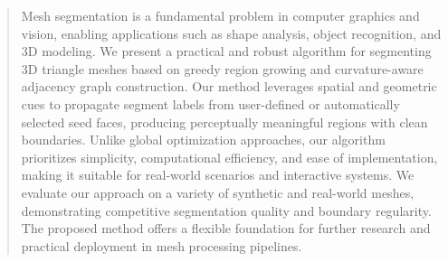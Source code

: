 \begin{abstract}
Mesh segmentation is a fundamental problem in computer graphics and vision, enabling applications such as shape analysis, object recognition, and 3D modeling. We present a practical and robust algorithm for segmenting 3D triangle meshes based on greedy region growing and curvature-aware adjacency graph construction. Our method leverages spatial and geometric cues to propagate segment labels from user-defined or automatically selected seed faces, producing perceptually meaningful regions with clean boundaries. Unlike global optimization approaches, our algorithm prioritizes simplicity, computational efficiency, and ease of implementation, making it suitable for real-world scenarios and interactive systems. We evaluate our approach on a variety of synthetic and real-world meshes, demonstrating competitive segmentation quality and boundary regularity. The proposed method offers a flexible foundation for further research and practical deployment in mesh processing pipelines.
\end{abstract}

